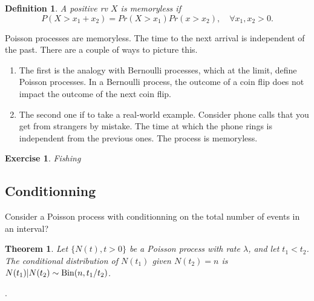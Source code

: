 \documentclass[12pt,a4paper]{article}
\newtheorem{theorem}{Theorem}
\newtheorem{definition}{Definition}
\newtheorem{exercise}{Exercise}
\begin{document}
\begin{definition}
	A positive rv $X$ is memoryless if 
	\begin{equation}
		P(X>x_1+x_2) = Pr(X>x_1)Pr(x>x_2), \quad\forall x_1,x_2>0.
	\end{equation}
\end{definition}
Poisson processes are memoryless. The time to the next arrival is independent of the past.
There are a couple of ways to picture this. 
\begin{enumerate}
	\item 
	The first is the analogy with Bernoulli processes, which at the limit, define Poisson processes. In a Bernoulli process, the outcome of a coin flip does not impact the outcome of the next coin flip.
	\item	The second one if to take a real-world example. Consider phone calls that you get from strangers by mistake. The time at which the phone rings is independent from the previous ones. The process is memoryless. 
\end{enumerate}

\begin{exercise}
	Fishing 
\end{exercise}

\subsection{Conditionning}
Consider a Poisson process with conditionning on the total number
of events in an interval?
\begin{theorem}
	Let $\{N (t), t > 0\}$ be a Poisson process with
	rate $\lambda$, and let $t_1 < t_2$. 
	The conditional distribution of $N(t_1)$ given $N(t_2) = n$
	is
	$N (t_1) | N (t_2) \sim {\rm Bin}(n,t_1/t_2)$.
\end{theorem}
.
\end{document}
